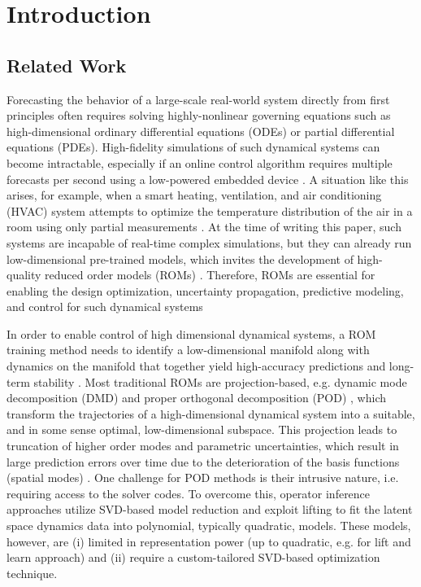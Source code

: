 
\section{Introduction}
\subsection{Related Work}
        Forecasting the behavior of a large-scale real-world system directly from first principles often requires solving highly-nonlinear governing equations such as high-dimensional ordinary differential equations (ODEs) or partial differential equations (PDEs). 
        High-fidelity simulations of such dynamical systems can become intractable, especially if an online control algorithm requires multiple forecasts per second using a low-powered embedded device \cite{rowley2017model,lucia2004reduced,benner2015survey}. A situation like this arises, for example, when a smart heating, ventilation, and air conditioning (HVAC) system attempts to optimize the temperature distribution of the air in a room using only partial measurements \cite{farahmand2016learning,nabi2022robust}. At the time of writing this paper, such systems are incapable of real-time complex simulations, but they can already run low-dimensional pre-trained models, which invites the development of high-quality reduced order models (ROMs) \cite{otterness2017evaluation}. Therefore, ROMs are essential for enabling the design optimization, uncertainty propagation, predictive modeling, and control for such dynamical systems \cite{brunton2022data,kutz2016dynamic,rowley2017model,jones2020characterising}
        
        In order to enable control of high dimensional dynamical systems, a ROM training method needs to  identify a low-dimensional manifold along with dynamics on the manifold that together yield high-accuracy predictions and long-term stability \cite{ahmed2021closures,noack2011reduced}. Most traditional ROMs are projection-based, e.g. dynamic mode decomposition (DMD) \cite{kutz2016dynamic,tu2013dynamic} and proper orthogonal decomposition (POD) \cite{holmes2012turbulence}, which transform the trajectories of a high-dimensional dynamical system into a suitable, and in some sense optimal, low-dimensional subspace. This projection leads to truncation of higher order modes and parametric uncertainties, which result in large prediction errors over time due to the deterioration of the basis functions (spatial modes) \cite{benner2015survey}. One challenge for POD methods is their intrusive nature, i.e. requiring access to the solver codes. To overcome this, operator inference approaches \cite{qian2020lift,peherstorfer2016data} utilize SVD-based model reduction and  exploit lifting to fit the latent space dynamics data into polynomial, typically quadratic, models. These models, however, are (i) limited in representation power (up to quadratic, e.g. for lift and learn approach) and (ii) require a custom-tailored SVD-based optimization technique. 
        
